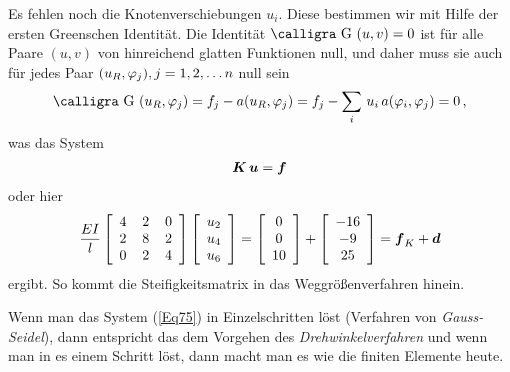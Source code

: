 {{Es fehlen noch die Knotenverschiebungen $u_i$. Diese bestimmen wir mit Hilfe der ersten Greenschen Identit\"{a}t. Die Identit\"{a}t $\text{\normalfont\calligra G\,\,}(u,v) = 0$ ist f\"{u}r alle Paare $(u,v)$ von hinreichend glatten Funktionen null, und daher muss sie auch f\"{u}r jedes Paar $(u_R,\varphi_j), j = 1,2,\ldots n$ null sein
\begin{align}\label{Eq74}
\text{\normalfont\calligra G\,\,}(u_R,\Np_j) = f_j - a(u_R,\Np_j) = f_j - \sum_i\,u_i\,a(\Np_i,\Np_j) = 0\,,
\end{align}
was das System
\begin{align}\label{Eq75}
\mbox{\boldmath $K$}\,\mbox{\boldmath $u$} = \mbox{\boldmath $f$}
\end{align}
oder hier
\begin{align}
\frac{EI}{l} \left[\barr{c @{\hspace{4mm}}c @{\hspace{4mm}}c} 4 & 2 & 0 \\ 2 & 8 & 2 \\ 0 & 2 & 4 \earr \right]\left[\barr{c c c} u_2 \\ u_4 \\ u_6 \earr \right] = \left[\barr{c c c} 0 \\ 0 \\ 10 \earr \right] + \left[\barr{c c c} -16 \\ -9 \\ 25 \earr \right] = \vek f_K + \vek d
\end{align}
ergibt. So kommt die Steifigkeitsmatrix in das Weggr\"{o}{\ss}enverfahren hinein.

Wenn man das System (\ref{Eq75}) in Einzelschritten l\"{o}st (Verfahren von {\em Gauss-Seidel\/}), dann entspricht das dem Vorgehen des {\em Drehwinkelverfahren\/}  und wenn man in es einem Schritt l\"{o}st, dann macht man es wie die finiten Elemente heute.

}}
